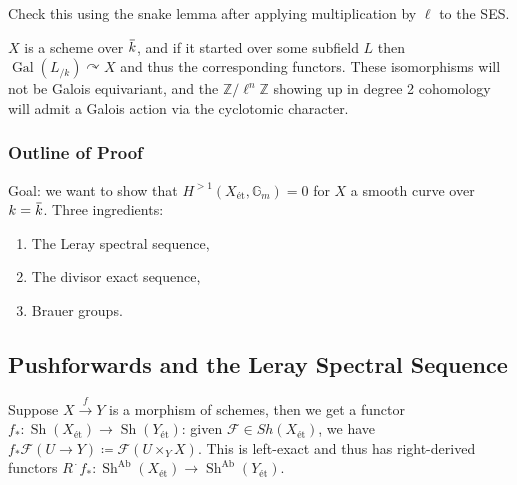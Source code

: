 \begin{exercise}[?]

Check this using the snake lemma after applying multiplication by
\(\ell\) to the SES.

\end{exercise}

\begin{remark}

\(X\) is a scheme over
\(\mkern 1.5mu\overline{\mkern-1.5muk\mkern-1.5mu}\mkern 1.5mu\), and if
it started over some subfield \(L\) then
\(\operatorname{Gal}(L_{/k}) \curvearrowright X\) and thus the
corresponding functors. These isomorphisms will not be Galois
equivariant, and the \(\mathbb{Z}/\ell^n\mathbb{Z}\) showing up in
degree 2 cohomology will admit a Galois action via the cyclotomic
character.

\end{remark}

\hypertarget{outline-of-proof}{%
\subsubsection{Outline of Proof}\label{outline-of-proof}}

Goal: we want to show that \(H^{>1}(X_\text{ét}, {\mathbb{G}}_m) = 0\)
for \(X\) a smooth curve over
\(k=\mkern 1.5mu\overline{\mkern-1.5muk\mkern-1.5mu}\mkern 1.5mu\).
Three ingredients:

\begin{enumerate}
\def\labelenumi{\arabic{enumi}.}
\item
  The Leray spectral sequence,
\item
  The divisor exact sequence,
\item
  Brauer groups.
\end{enumerate}

\hypertarget{pushforwards-and-the-leray-spectral-sequence}{%
\subsection{Pushforwards and the Leray Spectral
Sequence}\label{pushforwards-and-the-leray-spectral-sequence}}

Suppose \(X\xrightarrow{f} Y\) is a morphism of schemes, then we get a
functor
\(f_*:{\operatorname{Sh}}(X_\text{ét}) \to {\operatorname{Sh}}(Y_\text{ét})\):
given \(\mathcal{F}\in Sh(X_\text{ét})\), we have
\(f_* \mathcal{F}(U\to Y) \coloneqq\mathcal{F}(U\times_Y X)\). This is
left-exact and thus has right-derived functors
\(R^{\,\cdot\,}f_*:{\operatorname{Sh}}^{\operatorname{Ab}}(X_\text{ét}) \to {\operatorname{Sh}}^{\operatorname{Ab}}(Y_\text{ét})\).

